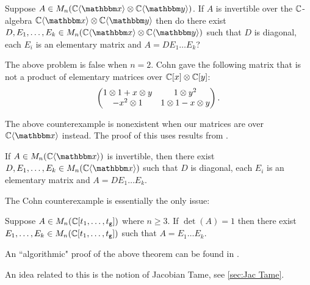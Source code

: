 
\begin{problem}
	Suppose $A\in M_n(\C\fralg{\bbx}\otimes \C\fralg{\bby})$. If $A$ is invertible over the $\mathbb{C}$-algebra $\C\fralg{\bbx}\otimes \C\fralg{\bby}$ then do there exist $D,E_1,\dots, E_k\in M_n(\C\fralg{\bbx}\otimes \C\fralg{\bby})$ such that $D$ is diagonal, each $E_i$ is an elementary matrix and $A = DE_1\dots E_k$?
\end{problem}

\begin{remark}
	The above problem is false when $n=2$. Cohn gave the following matrix that is not a product of elementary matrices over $\mathbb{C}[x]\otimes \mathbb{C}[y]$:
	\[
		\begin{pmatrix} 1\otimes 1 + x\otimes y & 1\otimes y^2 \\ -x^2\otimes 1 & 1\otimes 1 - x\otimes y \end{pmatrix}.
	\]
\end{remark}

The above counterexample is nonexistent when our matrices are over $\C\fralg{\bbx}$ instead. The proof of this uses results from \cite{SuslinCohn06}.

\begin{theorem}
	If $A\in M_n(\C\fralg{\bbx})$ is invertible, then there exist $D,E_1,\dots, E_k\in M_n(\C\fralg{\bbx})$ such that $D$ is diagonal, each $E_i$ is an elementary matrix and $A = DE_1\dots E_k$.
\end{theorem}

The Cohn counterexample is essentially the only issue:

\begin{theorem}
	Suppose $A\in M_n(\mathbb{C}[t_1,\dots, t_{\texttt{g}}])$ where $n\geq 3$. If $\det(A) = 1$ then there exist $E_1,\dots, E_k\in M_n(\mathbb{C}[t_1,\dots, t_{\texttt{g}}])$ such that $A = E_1\dots E_k$.
\end{theorem}

An ``algorithmic" proof of the above theorem can be found in \cite{SuslinPW95}.


\begin{remark}
	An idea related to this is the notion of Jacobian Tame, see \ref{sec:Jac Tame}.
\end{remark}


\begingroup
\renewcommand{\addcontentsline}[3]{}%
\renewcommand{\section}[2]{}%

